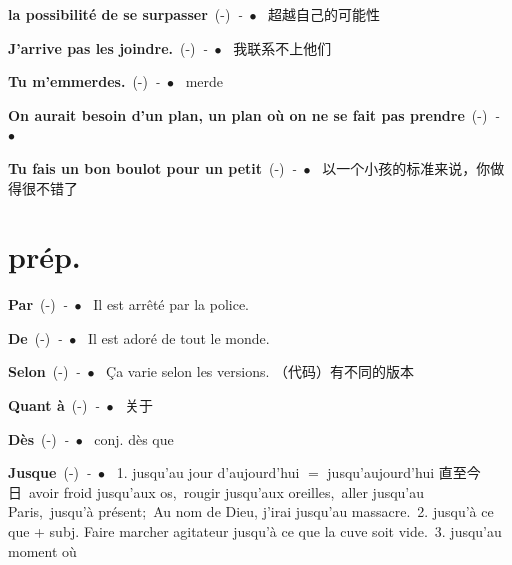 \documentclass[10pt,a4paper,twoside]{article} %
\newcommand{\entry}[4]{\textbf{#1}\ {(#2)}\ \textit{#3}\ $\bullet$\ {#4}} %
\begin{document}
\begin{CJK*}{UTF8}{gkai}
\begin{multicols}{2}

\entry{la possibilité de se surpasser}{-}{-}
{
超越自己的可能性
}

\entry{J'arrive pas les joindre.}{-}{-}
{
我联系不上他们
}

\entry{Tu m'emmerdes.}{-}{-}
{
merde
}

\entry{On aurait besoin d'un plan, un plan o\`u on ne se fait pas prendre}{-}{-}
{
}

\entry{Tu fais un bon boulot pour un petit}{-}{-}
{
以一个小孩的标准来说，你做得很不错了
}

\end{multicols}


\section*{prép.}

\begin{multicols}{2}

\entry{Par}{-}{-}
{
Il est arrêté par la police.
}

\entry{De}{-}{-}
{
Il est adoré de tout le monde.
}

\entry{Selon}{-}{-}
{
Ça varie selon les versions. （代码）有不同的版本
}

\entry{Quant à}{-}{-}
{
关于
}

\entry{Dès}{-}{-}
{
conj. dès que 
}

\entry{Jusque}{-}{-}
{
1. jusqu'au jour d'aujourd'hui $=$ jusqu'aujourd'hui 直至今日\ 
avoir froid jusqu'aux os,\ rougir jusqu'aux oreilles,\ aller jusqu'au Paris,\ jusqu'à présent;\
Au nom de Dieu, j'irai jusqu'au massacre.\ 
2. jusqu'à ce que + subj. Faire marcher agitateur jusqu'à ce que la cuve soit vide.\ 
3. jusqu'au moment o\`u
}

\end{multicols}

\end{CJK*}
\end{document}
